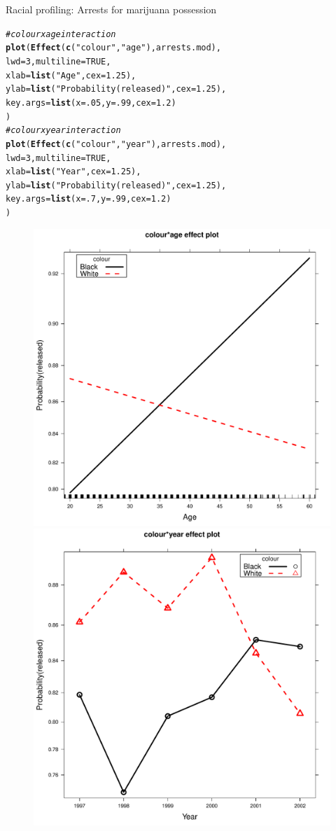 \documentclass[11pt]{book}\usepackage[]{graphicx}\usepackage[]{color}
\makeatletter
\newcommand{\hlnum}[1]{\textcolor[rgb]{0.686,0.059,0.569}{#1}}%
\newcommand{\hlstr}[1]{\textcolor[rgb]{0.192,0.494,0.8}{#1}}%
\newcommand{\hlcom}[1]{\textcolor[rgb]{0.678,0.584,0.686}{\textit{#1}}}%
\newcommand{\hlstd}[1]{\textcolor[rgb]{0.345,0.345,0.345}{#1}}%
\newcommand{\hlkwc}[1]{\textcolor[rgb]{0.333,0.667,0.333}{#1}}%
\newcommand{\hlkwd}[1]{\textcolor[rgb]{0.737,0.353,0.396}{\textbf{#1}}}%
\newenvironment{kframe}{%
 \def\at@end@of@kframe{}%
 \ifinner\ifhmode%
  \def\at@end@of@kframe{\end{minipage}}%
  \begin{minipage}{\columnwidth}%
 \fi\fi%
 \def\FrameCommand##1{\hskip\@totalleftmargin \hskip-\fboxsep
 \colorbox{shadecolor}{##1}\hskip-\fboxsep
     \hskip-\linewidth \hskip-\@totalleftmargin \hskip\columnwidth}%
 \MakeFramed {\advance\hsize-\width
   \@totalleftmargin\z@ \linewidth\hsize
   \@setminipage}}%
 {\par\unskip\endMakeFramed%
 \at@end@of@kframe}
\newenvironment{knitrout}{}{} %
\renewenvironment{knitrout}{\small\renewcommand{\baselinestretch}{.85}}{} %
\makeatother
\begin{document}
\begin{Example}[arrests]{Racial profiling: Arrests for marijuana possession}
\begin{knitrout}
\color{fgcolor}\begin{kframe}
\begin{alltt}
\hlcom{# colour x age interaction}
\hlkwd{plot}\hlstd{(}\hlkwd{Effect}\hlstd{(}\hlkwd{c}\hlstd{(}\hlstr{"colour"}\hlstd{,}\hlstr{"age"}\hlstd{), arrests.mod),}
     \hlkwc{lwd}\hlstd{=}\hlnum{3}\hlstd{,} \hlkwc{multiline}\hlstd{=}\hlnum{TRUE}\hlstd{,}
     \hlkwc{xlab}\hlstd{=}\hlkwd{list}\hlstd{(}\hlstr{"Age"}\hlstd{,} \hlkwc{cex}\hlstd{=}\hlnum{1.25}\hlstd{),}
     \hlkwc{ylab}\hlstd{=}\hlkwd{list}\hlstd{(}\hlstr{"Probability(released)"}\hlstd{,} \hlkwc{cex}\hlstd{=}\hlnum{1.25}\hlstd{),}
     \hlkwc{key.args}\hlstd{=}\hlkwd{list}\hlstd{(}\hlkwc{x}\hlstd{=}\hlnum{.05}\hlstd{,} \hlkwc{y}\hlstd{=}\hlnum{.99}\hlstd{,} \hlkwc{cex}\hlstd{=}\hlnum{1.2}\hlstd{)}
     \hlstd{)}
\hlcom{# colour x year interaction}
\hlkwd{plot}\hlstd{(}\hlkwd{Effect}\hlstd{(}\hlkwd{c}\hlstd{(}\hlstr{"colour"}\hlstd{,}\hlstr{"year"}\hlstd{), arrests.mod),}
     \hlkwc{lwd}\hlstd{=}\hlnum{3}\hlstd{,} \hlkwc{multiline}\hlstd{=}\hlnum{TRUE}\hlstd{,}
     \hlkwc{xlab}\hlstd{=}\hlkwd{list}\hlstd{(}\hlstr{"Year"}\hlstd{,} \hlkwc{cex}\hlstd{=}\hlnum{1.25}\hlstd{),}
     \hlkwc{ylab}\hlstd{=}\hlkwd{list}\hlstd{(}\hlstr{"Probability(released)"}\hlstd{,} \hlkwc{cex}\hlstd{=}\hlnum{1.25}\hlstd{),}
     \hlkwc{key.args}\hlstd{=}\hlkwd{list}\hlstd{(}\hlkwc{x}\hlstd{=}\hlnum{.7}\hlstd{,} \hlkwc{y}\hlstd{=}\hlnum{.99}\hlstd{,} \hlkwc{cex}\hlstd{=}\hlnum{1.2}\hlstd{)}
     \hlstd{)}
\end{alltt}
\end{kframe}\begin{figure}[!htbp]


\centerline{\includegraphics[width=.49\textwidth]{ch07/fig/arrests-eff2-1} 
\includegraphics[width=.49\textwidth]{ch07/fig/arrests-eff2-2} }


\end{figure}
\end{knitrout}
\end{Example}
\end{document}
